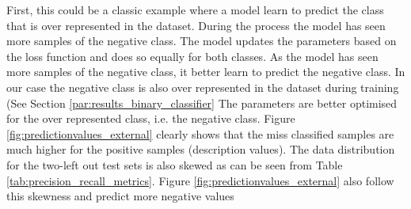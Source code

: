 \documentclass[a4paper, 12pt, oneside]{book} %
\begin{document}
First, this could be a classic example where a model learn to predict the class that is over represented in the dataset.
During the process the model has seen more samples of the negative class.
The model updates the parameters based on the loss function and does so equally for both classes.
As the model has seen more samples of the negative class, it better learn to predict the negative class.
In our case the negative class is also over represented in the dataset during training (See Section \ref{par:results_binary_classifier}
The parameters are better optimised for the over represented class, i.e. the negative class.
Figure \ref{fig:predictionvalues_external} clearly shows that the miss classified samples are much higher for the positive samples (description values). 
The data distribution for the two-left out test sets is also skewed as can be seen from Table \ref{tab:precision_recall_metrics}.
Figure \ref{fig:predictionvalues_external} also follow this skewness and predict more negative values 
\end{document}
